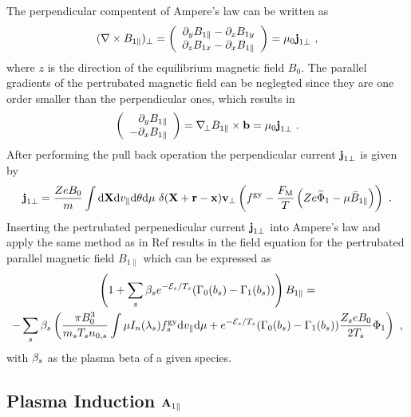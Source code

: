 The perpendicular compentent of Ampere's law can be written as 
\begin{gather}
	(\nabla \times B_{1\parallel})_\perp = \left( \begin{array}{c} \partial_y B_{1 \parallel} - \partial_z B_{1 y} \\ \partial_z B_{1x} - \partial_x B_{1 \parallel} \end{array} \right) = \mu_0 \boldsymbol{\mathbf{j}}_{1 \perp}~,
	\label{eq:perpendicularAmpereLaw}
\end{gather}
where $z$ is the direction of the equilibrium magnetic field $B_0$. The parallel gradients of the pertrubated magnetic field can be neglegted since they are one order smaller than the perpendicular ones, which results in
\begin{gather}
	\left( \begin{array}{r} \partial_y B_{1 \parallel} \\ - \partial_x B_{1 \parallel} \end{array} \right) = \nabla_{\!\perp} B_{1\parallel} \times \boldsymbol{\mathbf{b}} = \mu_0 \boldsymbol{\mathbf{j}}_{1 \perp}~.
\end{gather}
After performing the pull back operation the perpendicular current $\boldsymbol{\mathbf{j}}_{1\perp}$ is given by 
\begin{gather}
		\boldsymbol{\mathbf{j}}_{1\perp} = \frac{Ze B_0}{m} \int \mathrm{d}\boldsymbol{\mathbf{X}}\mathrm{d}v_\parallel\mathrm{d}\theta\mathrm{d}\mu ~ \delta(\boldsymbol{\mathbf{X}} + \boldsymbol{\mathbf{r}} - \boldsymbol{\mathbf{x}}) \boldsymbol{\mathbf{v}}_\perp \left(f^{\mathrm{gy}} - \frac{F_\mathrm{M}}{T}\left(Ze \widetilde{\Phi}_1 - \mu \bar{B}_{1\parallel}\right) \right) ~.
	\label{eq:perpendicularCurrentPullback}
\end{gather}
Inserting the pertrubated perpenedicular current $\boldsymbol{\mathbf{j}}_{1 \perp}$ into Ampere's law and apply the same method as in Ref  results in the field equation for the pertrubated parallel magnetic field $B_{1\parallel}$ which can be expressed as
\begin{gather}
	\left(1 + \sum_s \beta_s e^{-\mathcal{E}_s/T_s} (\Gamma_0(b_s) - \Gamma_1(b_s))\right) B_{1\parallel} = \\
	- \sum_s \beta_s \left(\frac{\pi B_0^3}{m_sT_sn_{0,s}} \int \mu I_n(\lambda_s) f^{\mathrm{gy}}_s \mathrm{d}v_\parallel\mathrm{d}\mu + e^{-\mathcal{E}_s/T_s} (\Gamma_0(b_s) - \Gamma_1(b_s)) \frac{Z_seB_0}{2 T_s} \Phi_1 \right) ~,
\end{gather}
with $\beta_s$ as the plasma beta of a given species.

\newpage

\subsection{Plasma Induction $\boldsymbol{\mathbf{A}}_{1\parallel}$}
\label{sub:fieldInduction}

